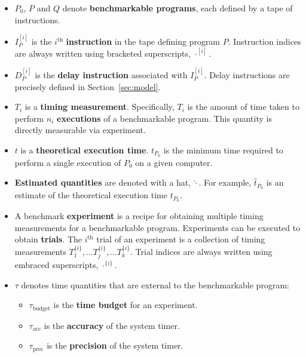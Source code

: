 \documentclass[conference]{IEEEtran}
\begin{document}
\begin{itemize}
    \item
    $P_0$, $P$ and $Q$ denote \textbf{benchmarkable programs}, each defined by a tape of
    instructions.

    \item
    $I^{[i]}_{P}$ is the $i^{\textrm{th}}$ \textbf{instruction} in the tape defining program $P$.
    Instruction indices are always written using bracketed superscripts, $\cdot^{[i]}$.

    \item
    $D^{[i]}_{P}$ is the \textbf{delay instruction} associated with $I^{[i]}_{P}$. Delay
    instructions are precisely defined in Section~\ref{sec:model}.

    \item
    $T_i$ is a \textbf{timing measurement}. Specifically, $T_i$ is the amount of time taken
    to perform $n_i$ \textbf{executions} of a benchmarkable program. This quantity is
    directly measurable via experiment.

    \item
    $t$ is a \textbf{theoretical execution time}. $t_{P_0}$ is the minimum time required to
    perform a single execution of $P_0$ on a given computer.

    \item
    \textbf{Estimated quantities} are denoted with a hat, $\hat\cdot$. For example,
    $\hat{t}_{P_0}$ is an estimate of the theoretical execution time $t_{P_0}$.

    \item
    A benchmark \textbf{experiment} is a recipe for obtaining multiple timing measurements
    for a benchmarkable program. Experiments can be executed to obtain \textbf{trials}. The
    $i^{\textrm{th}}$ trial of an experiment is a collection of timing measurements
    $T^{\{i\}}_1, \dots T^{\{i\}}_j, \dots T^{\{i\}}_k$. Trial indices are always
    written using embraced superscripts, $\cdot^{\{i\}}$.

    \item
    $\tau$ denotes time quantities that are external to the benchmarkable program:
    \begin{itemize}
        \item $\tau_{\textrm{budget}}$ is the \textbf{time budget} for an experiment.
        \item $\tau_{\textrm{acc}}$ is the \textbf{accuracy} of the system timer.
        \item $\tau_{\textrm{prec}}$ is the \textbf{precision} of the system timer.
    \end{itemize}


\end{itemize}
\end{document}
